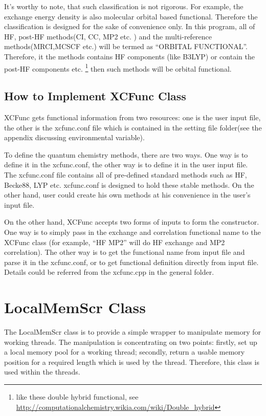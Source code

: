 It's worthy to note, that such classification is not rigorous. For example, the
exchange energy density is also molecular orbital based functional. Therefore
the classification is designed for the sake of convenience only. In this
program, all of HF, post-HF methods(CI, CC, MP2 etc. ) and the multi-reference
methods(MRCI,MCSCF etc.) will be termed as ``ORBITAL FUNCTIONAL''. Therefore,
it the methods contains HF components (like B3LYP) or contain the post-HF
components etc. \footnote{like these double hybrid functional, see
\url{http://computationalchemistry.wikia.com/wiki/Double_hybrid}} then such
methods will be orbital functional.

\subsection{How to Implement XCFunc Class}
%
%
XCFunc gets functional information from two resources: one is the user input file,
the other is the xcfunc.conf file which is contained in the setting file 
folder(see the appendix discussing environmental variable). 

To define the quantum chemistry methods, there are two ways. One way is to 
define it in the xcfunc.conf, the other way is to define it in the user 
input file. The xcfunc.conf file contains all of pre-defined standard methods
such as HF, Becke88, LYP etc. xcfunc.conf is designed to hold these stable 
methods. On the other hand, user could create his own methods at his 
convenience in the user's input file.

On the other hand, XCFunc accepts two forms of inputs to form the constructor.
One way is to simply pass in the exchange and correlation functional name
to the XCFunc class (for example, ``HF  MP2'' will do HF exchange and 
MP2 correlation). The other way is to get the functional name from 
input file and parse it in the xcfunc.conf, or to get functional definition 
directly from input file. Details could be referred from the xcfunc.cpp
in the general folder.

\section{LocalMemScr Class}

The LocalMemScr class is to provide a simple wrapper to manipulate
memory for working threads. The manipulation is concentrating on two points:
firstly, set up a local memory pool for a working thread; secondly, return
a usable memory position for a required length which is used by the thread.
Therefore, this class is used within the threads.

